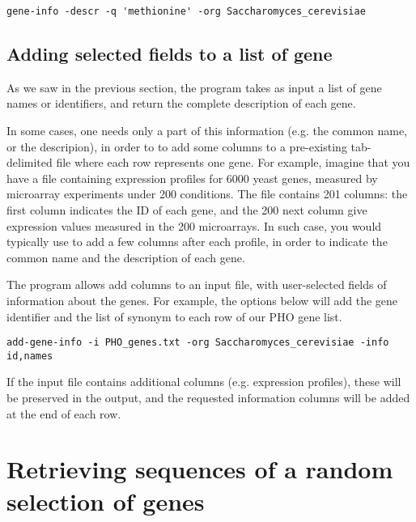 {\color{Blue} \begin{footnotesize}
\begin{verbatim}
gene-info -descr -q 'methionine' -org Saccharomyces_cerevisiae
\end{verbatim} \end{footnotesize}
}

\subsection{Adding selected fields to a list of gene}

As we saw in the previous section, the program 
takes as input a list of gene names or identifiers, and return the
complete description of each gene.

In some cases, one needs only a part of this information (e.g. the
common name, or the descripion), in order to to add some columns to a
pre-existing tab-delimited file where each row represents one
gene. For example, imagine that you have a file containing expression
profiles for 6000 yeast genes, measured by microarray experiments
under 200 conditions. The file contains 201 columns: the first column
indicates the ID of each gene, and the 200 next column give expression
values measured in the 200 microarrays. In such case, you would
typically use  to add a few columns after each
profile, in order to indicate the common name and the description of
each gene.

The program  allows add columns to an input
file, with user-selected fields of information about the genes. For
example, the options below will add the gene identifier and the list
of synonym to each row of our PHO gene list. 

{\color{Blue} \begin{footnotesize}
\begin{verbatim}
add-gene-info -i PHO_genes.txt -org Saccharomyces_cerevisiae -info id,names
\end{verbatim} \end{footnotesize}
}

If the input file contains additional columns (e.g. expression
profiles), these will be preserved in the output, and the requested
information columns will be added at the end of each row.

\section{Retrieving sequences of a random selection of genes}

